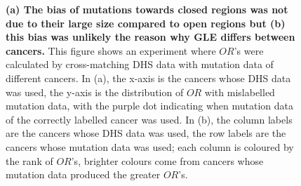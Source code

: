 \begin{figure}[ht!]
    \caption{\textbf{(a) The bias of mutations towards closed regions was not due to their large size compared to open regions but (b) this bias was unlikely the reason why GLE differs between cancers.} This figure shows an experiment where $OR$'s were calculated by cross-matching DHS data with mutation data of different cancers. In (a), the x-axis is the cancers whose DHS data was used, the y-axis is the distribution of $OR$ with mislabelled mutation data, with the purple dot indicating when mutation data of the correctly labelled cancer was used. In (b), the column labels are the cancers whose DHS data was used, the row labels are the cancers whose mutation data was used; each column is coloured by the rank of $OR$'s, brighter colours come from cancers whose mutation data produced the greater $OR$'s.}
    \label{fig:mixed_or}
\end{figure}